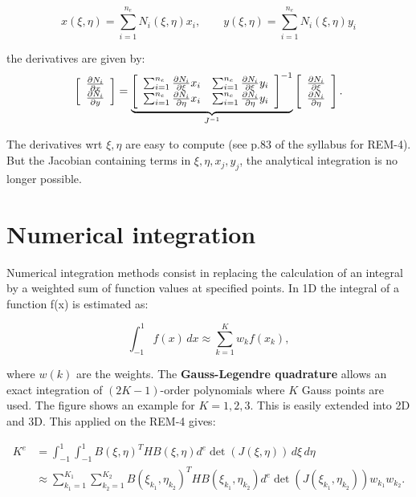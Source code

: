 	\begin{equation}
	x(\xi, \eta) = \sum_{i=1}^{n_e} N_i(\xi, \eta) x_i, \qquad y(\xi, \eta) = \sum_{i=1}^{n_e} N_i(\xi, \eta) y_i
	\end{equation}
	
	the derivatives are given by: 
	\begin{equation}
	\left[
	\begin{array}{c}
	\frac{\partial N_i}{\partial x}\\
	\frac{\partial N_i}{\partial y}
	\end{array}
	\right]
	=
	\underbrace{
	\left[
	\begin{array}{cc}
	\sum_{i=1}^{n_e} \frac{\partial N_i}{\partial \xi}x_i & \sum_{i=1}^{n_e}\frac{\partial N_i}{\partial \xi}y_i\\
	\sum_{i=1}^{n_e} \frac{\partial N_i}{\partial \eta}x_i & \sum_{i=1}^{n_e}\frac{\partial N_i}{\partial \eta}y_i\\
	\end{array}
	\right]^{-1}
	}_{J^{-1}}
	\left[
	\begin{array}{c}
	\frac{\partial N_i}{\partial \xi}\\
	\frac{\partial N_i}{\partial \eta}
	\end{array}
	\right].
	\end{equation}
	
	The derivatives wrt $\xi, \eta$ are easy to compute (see p.83 of the syllabus for REM-4). But the Jacobian containing terms in $\xi, \eta, x_j, y_j$, the analytical integration is no longer possible. 
	
\section{Numerical integration}
	Numerical integration methods consist in replacing the calculation of an integral by a weighted sum of function values at specified points. In 1D the integral of a function f(x) is estimated as: 
	
	\begin{equation}
	\int _{-1}^1 f(x) \, dx \approx \sum _{k=1}^K w_k f(x_k), 
	\end{equation}	 

	where $w(k)$ are the weights. The \textbf{Gauss-Legendre quadrature} allows an exact integration of $(2K-1)$-order polynomials where $K$ Gauss points are used. The figure shows an example for $K=1,2,3$. This is easily extended into 2D and 3D. This applied on the REM-4 gives: 
	
	\begin{equation}
	\begin{aligned}
	K^e &=\int_{-1}^1\int_{-1}^1 B(\xi,\eta) ^T HB(\xi, \eta) d^e \det(J(\xi, \eta)) \, d\xi\,  d\eta \\
	&\approx \sum _{k_1=1}^{K_1} \sum _{k_2=1}^{K_2} B(\xi _{k_1}, \eta _{k_2})^T H B(\xi _{k_1}, \eta _{k_2}) d^e \det(J(\xi_{k_1}, \eta _{k_2})) w_{k_1} w_{k_2}.
	\end{aligned}
	\end{equation}
	
